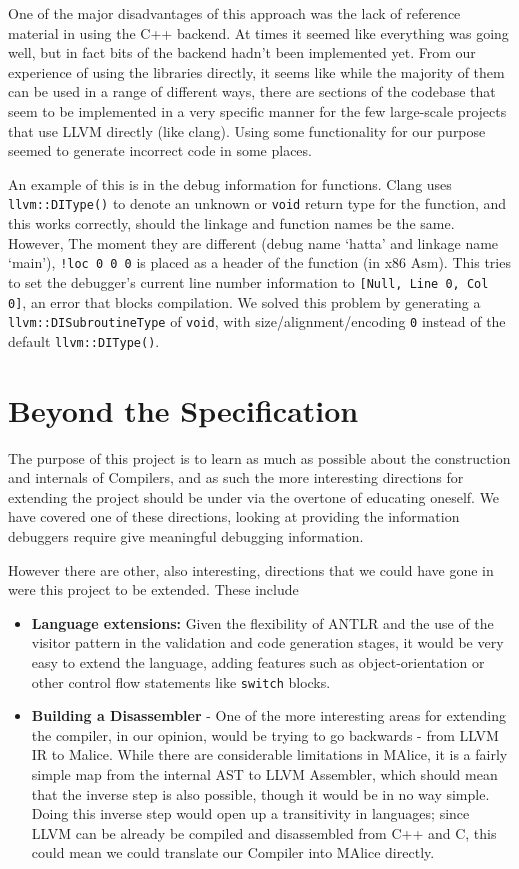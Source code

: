 \documentclass[a4wide, 11pt]{article}
\begin{document}
One of the major disadvantages of this approach was the lack of reference material in using the C++ backend. At times it seemed like everything was going well, but in fact bits of the backend hadn't been implemented yet. From our experience of using the libraries directly, it seems like while the majority of them can be used in a range of different ways, there are sections of the codebase that seem to be implemented in a very specific manner for the few large-scale projects that use LLVM directly (like clang). Using some functionality for our purpose seemed to generate incorrect code in some places.

An example of this is in the debug information for functions. Clang uses \texttt{llvm::DIType()} to denote an unknown or \texttt{void} return type for the function, and this works correctly, should the linkage and function names be the same. However, The moment they are different (debug name `hatta' and linkage name `main'), \texttt{!loc 0 0 0} is placed as a header of the function (in x86 Asm). This tries to set the debugger's current line number information to \texttt{[Null, Line 0, Col 0]}, an error that blocks compilation. We solved this problem by generating a \texttt{llvm::DISubroutineType} of \texttt{void}, with size/alignment/encoding \texttt{0} instead of the default \texttt{llvm::DIType()}. 

\section{Beyond the Specification}

The purpose of this project is to learn as much as possible about the construction and internals of Compilers, and as such the more interesting directions for extending the project should be under via the overtone of educating oneself. We have covered one of these directions, looking at providing the information debuggers require give meaningful debugging information. 

However there are other, also interesting, directions that we could have gone in were this project to be extended. These include
\begin{itemize}
\item \textbf{Language extensions:} Given the flexibility of ANTLR and the use of the visitor pattern in the validation and code generation stages, it would be very easy to extend the language, adding features such as object-orientation or other control flow statements like \texttt{switch} blocks.
\item \textbf{Building a Disassembler} - One of the more interesting areas for extending the compiler, in our opinion, would be trying to go backwards - from LLVM IR to Malice. While there are considerable limitations in MAlice, it is a fairly simple map from the internal AST to LLVM Assembler, which should mean that the inverse step is also possible, though it would be in no way simple. Doing this inverse step would open up a transitivity in languages; since LLVM can be already be compiled and disassembled from C++ and C, this could mean we could translate our Compiler into MAlice directly.
\end{itemize}
\end{document}
